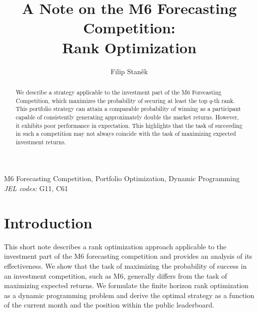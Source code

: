 \documentclass[3p,times,twocolumn]{elsarticle}
\begin{document}
\begin{frontmatter}

    \title{
        A Note on the M6 Forecasting Competition:\\
        Rank Optimization
    }
    \author{
        Filip Staněk
    }
    \address{CERGE-EI}

    \dochead{}

    \begin{abstract}
        We describe a strategy applicable to the investment part of the M6 Forecasting Competition, which maximizes the probability of securing at least the top $q$-th rank.
        This portfolio strategy can attain a comparable probability of winning as a participant capable of consistently generating approximately double the market returns.
        However, it exhibits poor performance in expectation.
        This highlights that the task of succeeding in such a competition may not always coincide with the task of maximizing expected investment returns.
    \end{abstract}

    \begin{keyword}
        M6 Forecasting Competition, Portfolio Optimization, Dynamic Programming\\
        \emph{JEL codes:} G11, C61

    \end{keyword}

\end{frontmatter}

\section{Introduction}

This short note describes a rank optimization approach applicable to the investment part of the M6 forecasting competition and provides an analysis of its effectiveness.
We show that the task of maximizing the probability of success in an investment competition, such as M6, generally differs from the task of maximizing expected returns.
We formulate the finite horizon rank optimization as a dynamic programming problem and derive the optimal strategy as a function of the current month and the position within the public leaderboard.
\end{document}
